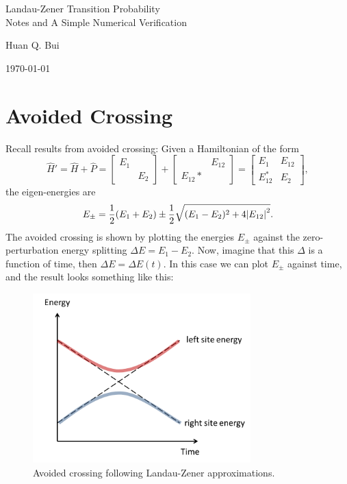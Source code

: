 \documentclass{article}
\theoremstyle{definition}
\newcommand{\f}[2]{\frac{#1}{#2}}
\begin{document}
	

\begin{center}
	\Large{Landau-Zener Transition Probability\\
	Notes and A Simple Numerical Verification}
\end{center}	
	
\begin{center}
	\large{Huan Q. Bui}
\end{center}

\begin{center}
	\today
\end{center}


\section{Avoided Crossing}

Recall results from avoided crossing: Given a Hamiltonian of the form 
\begin{equation*}
\widehat{H}' = \widehat{H} + \widehat{P} = \begin{bmatrix}
E_1 & \\ & E_2
\end{bmatrix} + \begin{bmatrix}
& E_{12} \\ E_{12}* &
\end{bmatrix} = \begin{bmatrix}
E_1 & E_{12} \\ E_{12}^* & E_2
\end{bmatrix},
\end{equation*}
the eigen-energies are
\begin{equation*}
E_\pm = \f{1}{2}(E_1 + E_2) \pm  \f{1}{2}\sqrt{(E_1 - E_2)^2 + 4\abs{E_{12}}^2}.
\end{equation*}
The avoided crossing is shown by plotting the energies $E_\pm$ against the zero-perturbation energy splitting $\Delta E = E_1 - E_2$. Now, imagine that this $\Delta$ is a function of time, then $\Delta E = \Delta E(t)$. In this case we can plot $E_\pm$ against time, and the result looks something like this:

\begin{figure}[!htb]
	\centering
	\includegraphics[width=0.75\textwidth]{avoided-crossing.png}
	\caption{Avoided crossing following Landau-Zener approximations.}
	\label{fig:LZ}
\end{figure}
\end{document}
